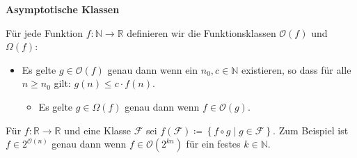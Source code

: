 %
\begin{defn}
\textbf{Asymptotische Klassen}

Für jede Funktion $f:\mathbb{N}\rightarrow\mathbb{R}$ definieren
wir die Funktionsklassen $\mathcal{O}\left(f\right)$ und $\Omega\left(f\right)$:

\end{defn}
\begin{itemize}
\item Es gelte $g\in\mathcal{O}\left(f\right)$ genau dann wenn ein $n_{0},c\in\mathbb{N}$
existieren, so dass für alle $n\geqslant n_{0}$ gilt: $g\left(n\right)\leqslant c\cdot f\left(n\right)$.
\begin{itemize}
\item Es gelte $g\in\Omega\left(f\right)$ genau dann wenn $f\in\mathcal{O}\left(g\right)$.
\end{itemize}
\end{itemize}
\begin{defn}
Für $f:\mathbb{R}\rightarrow\mathbb{R}$ und eine Klasse $\mathcal{F}$
sei $f\left(\mathcal{F}\right)\coloneqq\left\{ f\circ g\mid g\in\mathcal{F}\right\} $.
Zum Beispiel ist $f\in2^{\mathcal{O}\left(n\right)}$ genau dann wenn
$f\in\mathcal{O}\left(2^{kn}\right)$ für ein festes $k\in\mathbb{N}$.
\end{defn}


